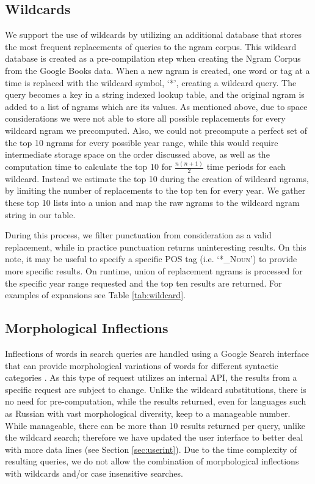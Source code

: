\documentclass[11pt]{article}
\begin{document}
\subsection{Wildcards}
\label{sec:wildcards}
	We support the use of wildcards by utilizing an additional database that stores the most frequent replacements of queries to the ngram corpus. This wildcard database is created as a pre-compilation step when creating the Ngram Corpus from the Google Books data. When a new ngram is created, one word or tag at a time is replaced with the wildcard symbol, `*', creating a wildcard query. The query becomes a key in a string indexed lookup table, and the original ngram is added to a list of ngrams which are its values. As mentioned above, due to space considerations we were not able to store all possible replacements for every wildcard ngram we precomputed. Also, we could not precompute a perfect set of the top 10 ngrams for every possible year range, while this would require intermediate storage space on the order discussed above, as well as the computation time to calculate the top 10 for $\frac{n(n+1)}{2}$ time periods for each wildcard. Instead we estimate the top 10 during the creation of wildcard ngrams, by limiting the number of replacements to the top ten for every year. We gather these top 10 lists into a union and map the raw ngrams to the wildcard ngram string in our table. 
	
	During this process, we filter punctuation from consideration as a valid replacement, while in practice punctuation returns uninteresting results. On this note, it may be useful to specify a specific \textsf{\textsc{POS}} tag (i.e. `*\textsf{\textsc{\_Noun}}') to provide more specific results. On runtime, union of replacement ngrams is processed for the specific year range requested and the top ten results are returned. For examples of expansions see Table \ref{tab:wildcard}. 


\subsection{Morphological Inflections}
Inflections of words in search queries are handled using a Google Search interface that can provide morphological variations of words for different syntactic categories \cite{durrett2013supervised}. As this type of request utilizes an internal API, the results from a specific request are subject to change. Unlike the wildcard substitutions, there is no need for pre-computation, while the results returned, even for languages such as Russian with vast morphological diversity, keep to a manageable number. While manageable, there can be more than 10 results returned per query, unlike the wildcard search; therefore we have updated the user interface to better deal with more data lines (see Section \ref{sec:userint}). Due to the time complexity of resulting queries, we do not allow the combination of morphological inflections with wildcards and/or case insensitive searches.
\end{document}
